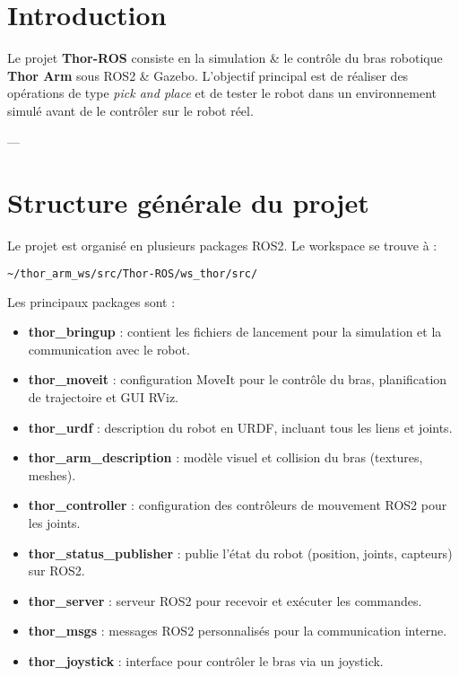 \documentclass[a4paper,12pt]{article}
\numberwithin{equation}{section}
\begin{document}
\tableofcontents
\newpage

\section{Introduction}
Le projet \textbf{Thor-ROS} consiste en la simulation \& le contrôle du bras robotique \textbf{Thor Arm} sous ROS2 \& Gazebo.  
L'objectif principal est de réaliser des opérations de type \textit{pick and place} et de tester le robot dans un environnement simulé avant de le contrôler sur le robot réel.  

---

\section{Structure générale du projet}

Le projet est organisé en plusieurs packages ROS2. Le workspace se trouve à :

\begin{lstlisting}[language=bash]
~/thor_arm_ws/src/Thor-ROS/ws_thor/src/
\end{lstlisting}

Les principaux packages sont :

\begin{itemize}
    \item \textbf{thor\_bringup} : contient les fichiers de lancement pour la simulation et la communication avec le robot.
    \item \textbf{thor\_moveit} : configuration MoveIt pour le contrôle du bras, planification de trajectoire et GUI RViz.
    \item \textbf{thor\_urdf} : description du robot en URDF, incluant tous les liens et joints.
    \item \textbf{thor\_arm\_description} : modèle visuel et collision du bras (textures, meshes).
    \item \textbf{thor\_controller} : configuration des contrôleurs de mouvement ROS2 pour les joints.
    \item \textbf{thor\_status\_publisher} : publie l'état du robot (position, joints, capteurs) sur ROS2.
    \item \textbf{thor\_server} : serveur ROS2 pour recevoir et exécuter les commandes.
    \item \textbf{thor\_msgs} : messages ROS2 personnalisés pour la communication interne.
    \item \textbf{thor\_joystick} : interface pour contrôler le bras via un joystick.
\end{itemize}
\end{document}
